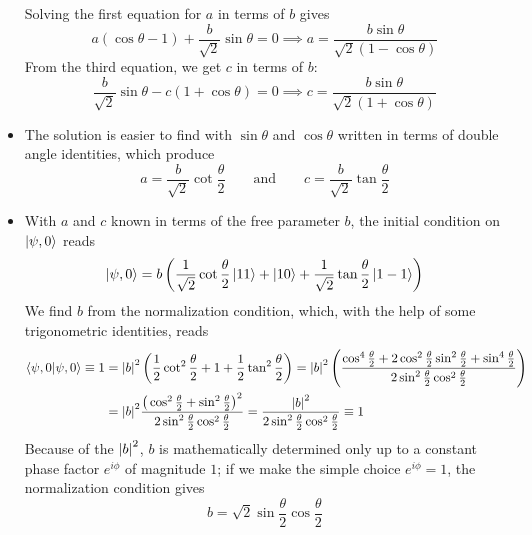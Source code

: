 \documentclass[11pt, a4paper]{article}
\newcommand{\eqtext}[1]{\qquad \text{#1} \qquad}
\begin{document}
\begin{itemize}
	Solving the first equation for $ a $ in terms of $ b $ gives
	\begin{equation*}
		a(\cos \theta - 1) + \frac{b}{\sqrt{2}} \sin \theta = 0 \implies a = \frac{b\sin \theta}{\sqrt{2}(1 - \cos \theta)}
	\end{equation*}
	From the third equation, we get $ c $ in terms of $ b $:
	\begin{equation*}
		\frac{b}{\sqrt{2}}\sin \theta - c(1 + \cos \theta) = 0 \implies c = \frac{b\sin \theta}{\sqrt{2}(1 + \cos \theta)}
	\end{equation*}
	
	\item The solution is easier to find with $ \sin \theta  $ and $ \cos \theta $ written in terms of double angle identities, which produce
	\begin{equation*}
		 a = \frac{b}{\sqrt{2}
		 }\cot \frac{\theta}{2} \eqtext{and}  c = \frac{b}{\sqrt{2}}\tan \frac{\theta}{2} 
	\end{equation*}
	
	\item With $ a $ and $ c $ known in terms of the free parameter $ b $, the initial condition on $ \ket{\psi, 0} $ reads
	\begin{equation*}
		\ket{\psi, 0} = b\left(\frac{1}{\sqrt{2}}\cot \frac{\theta}{2}\ket{11} + \ket{10} + \frac{1}{\sqrt{2}}\tan \frac{\theta}{2}\ket{1-1}  \right)
	\end{equation*}
	We find $ b $ from the normalization condition, which, with the help of some trigonometric identities, reads
	\begin{align*}
		\braket{\psi, 0}{\psi, 0} \equiv 1 &= \abs{b}^{2}\left(\frac{1}{2}\cot^{2}\frac{\theta}{2} + 1 + \frac{1}{2}\tan^{2}\frac{\theta}{2} \right) = \abs{b}^{2}\left(\frac{\cos^{4}\frac{\theta}{2} + 2 \cos^{2}\frac{\theta}{2}\sin^{2}\frac{\theta}{2} + \sin^{4}\frac{\theta}{2}}{2\sin^{2}\frac{\theta}{2}\cos^{2}\frac{\theta}{2}}\right)\\
		&=\abs{b}^{2}\frac{\big(\cos^{2}\frac{\theta}{2} + \sin^{2}\frac{\theta}{2}\big)^{2}}{2 \sin^{2}\frac{\theta}{2} \cos^{2}\frac{\theta}{2}}  = \frac{\abs{b}^{2}}{2 \sin^{2}\frac{\theta}{2} \cos^{2}\frac{\theta}{2}} \equiv 1
	\end{align*}
	Because of the $ \abs{b}^{2} $, $ b $ is mathematically determined only up to a constant phase factor $ e^{i\phi} $ of magnitude $ 1 $; if we make the simple choice $ e^{i\phi} = 1 $, the normalization condition gives
	\begin{equation*}
		b = \sqrt{2}\sin \frac{\theta}{2} \cos \frac{\theta}{2}
	\end{equation*}
	

\end{itemize}
\end{document}
